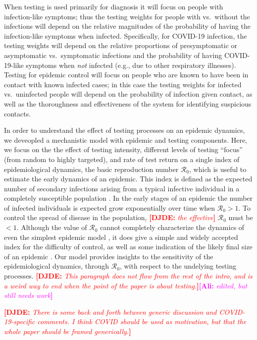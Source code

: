 \documentclass[12pt]{article}
\newcommand{\Rnum}{\mathcal{R}_0}
\newcommand{\covid}{COVID-19\xspace}
\newcommand{\comment}{\showcomment}
\newcommand{\showcomment}[3]{\textcolor{#1}{\textbf{[#2: }\textsl{#3}\textbf{]}}}
\newcommand{\ali}[1]{\comment{magenta}{Ali}{#1}}
\newcommand{\david}[1]{\comment{red}{DJDE}{#1}}
\theoremstyle{definition} %
\begin{document}
When testing is used primarily for diagnosis it will focus on people with infection-like symptoms; thus the testing weights for people with vs.\ without the infections will depend on the relative magnitudes of the probability of having the infection-like symptoms when infected. Specifically, for \covid infection, the testing weights will depend on the relative proportions of presymptomatic or asymptomatic vs.\ symptomatic infections and the probability of having \covid-like symptoms when \emph{not} infected (e.g., due to other respiratory illnesses). Testing for epidemic control will focus on people who are known to have been in contact with known infected cases; in this case the testing weights for infected vs.\ uninfected people will depend on the probability of infection given contact, as well as the thoroughness and effectiveness of the system for identifying suspicious contacts.

In order to understand the effect of testing processes on an epidemic dynamics, we deveopled a mechanistic model with epidemic and testing components. Here, we focus on the the effect of testing intensity, different levels of testing ``focus'' (from random to highly targeted), and rate of test return on a single index of epidemiological dynamics, the basic reproduction number $\Rnum$, which is useful to estimate the early dynamics of an epidemic. This index is defined as the expected number of secondary infections arising from a typical infective individual in a completely susceptible population \citep{dietz1993estimation}. 
In the early stages of an epidemic the number of infected individuals is expected grow exponentially over time when $\Rnum>1$. 
To control the spread of disease in the population, \david{the effective} $\Rnum$ must be $<1$.
Although the value of $\Rnum$ cannot completely characterize the dynamics of even the simplest epidemic model
\citep{shaw2021what}, it does give a simple and widely accepted index for the difficulty of control, as well as some indication of the likely final size of an epidemic \citep{ma2006generality}.
Our model provides insights to the sensitivity of the epidemiological dynamics, through $\Rnum$, with respect to the undelying testing processes.
\david{This paragraph does not flow from the rest of the intro, and is a weird way to end when the point of the paper is about testing.}\ali{edited, but still needs work}

\david{There is some back and forth between generic discussion and \covid-specific comments.  I think COVID should be used as motivation, but that the whole paper should be framed generically.}
\end{document}

